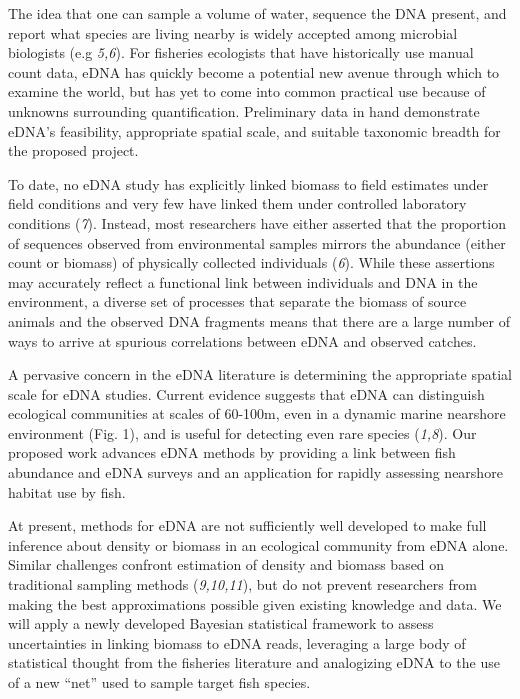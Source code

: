 \documentclass[]{article}
\begin{document}
The idea that one can sample a volume of water, sequence the DNA
present, and report what species are living nearby is widely accepted
among microbial biologists (e.g \emph{5,6}). For fisheries ecologists
that have historically use manual count data, eDNA has quickly become a
potential new avenue through which to examine the world, but has yet to
come into common practical use because of unknowns surrounding
quantification.{ Preliminary data in hand demonstrate eDNA's
feasibility, appropriate spatial scale, and suitable taxonomic breadth
for the proposed project.}

To date, no eDNA study has explicitly linked biomass to field estimates
under field conditions and very few have linked them under controlled
laboratory conditions (\emph{7}). Instead, most researchers have either
asserted that the proportion of sequences observed from environmental
samples mirrors the abundance (either count or biomass) of physically
collected individuals (\emph{6}). While these assertions may accurately
reflect a functional link between individuals and DNA in the
environment, a diverse set of processes that separate the biomass of
source animals and the observed DNA fragments means that there are a
large number of ways to arrive at spurious correlations between eDNA and
observed catches.{~}

A pervasive concern in the eDNA literature is determining the
appropriate spatial scale for eDNA studies. Current evidence suggests
that eDNA can distinguish ecological communities at scales of 60-100m,
even in a dynamic marine nearshore environment (Fig. 1), and is useful
for detecting even rare species (\emph{1,8}). Our proposed work advances
eDNA methods by providing a link between fish abundance and eDNA surveys
and an application for rapidly assessing nearshore habitat use by fish.

At present, methods for eDNA are not sufficiently well developed to make
full inference about density or biomass in an ecological community from
eDNA alone. Similar challenges confront estimation of density and
biomass based on traditional sampling methods (\emph{9,10,11}), but do
not prevent researchers from making the best approximations possible
given existing knowledge and data. We will apply a newly developed
Bayesian statistical framework to assess uncertainties in linking
biomass to eDNA reads, leveraging a large body of statistical thought
from the fisheries literature and analogizing eDNA to the use of a new
``net'' used to sample target fish species.{~}
\end{document}

